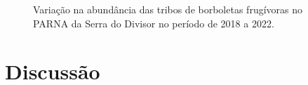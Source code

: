 \documentclass[
  letterpaper,
]{scrbook}
\begin{document}
\begin{figure}[H]


\caption{\label{fig-abundancia-parna-serra-divisor}Variação na
abundância das tribos de borboletas frugívoras no PARNA da Serra do
Divisor no período de 2018 a 2022.}

\end{figure}%

\section{Discussão}\label{discussuxe3o-1}
\end{document}
